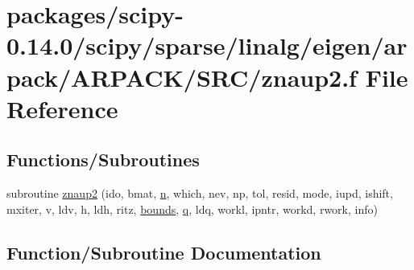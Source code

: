 \hypertarget{znaup2_8f}{}\section{packages/scipy-\/0.14.0/scipy/sparse/linalg/eigen/arpack/\+A\+R\+P\+A\+C\+K/\+S\+R\+C/znaup2.f File Reference}
\label{znaup2_8f}
\subsection*{Functions/\+Subroutines}
\begin{DoxyCompactItemize}
\item 
subroutine \hyperlink{znaup2_8f_a7fe1a2842ab86ee8373ffe299099f54f}{znaup2} (ido, bmat, \hyperlink{indexexpr_8h_ab427e2e2b4d6cec55fa088ea2a692ace}{n}, which, nev, np, tol, resid, mode, iupd, ishift, mxiter, v, ldv, h, ldh, ritz, \hyperlink{structbounds}{bounds}, \hyperlink{indexexpr_8h_ac886c3584e464b5533390d7440c9dd98}{q}, ldq, workl, ipntr, workd, rwork, info)
\end{DoxyCompactItemize}


\subsection{Function/\+Subroutine Documentation}
\hypertarget{znaup2_8f_a7fe1a2842ab86ee8373ffe299099f54f}{}
